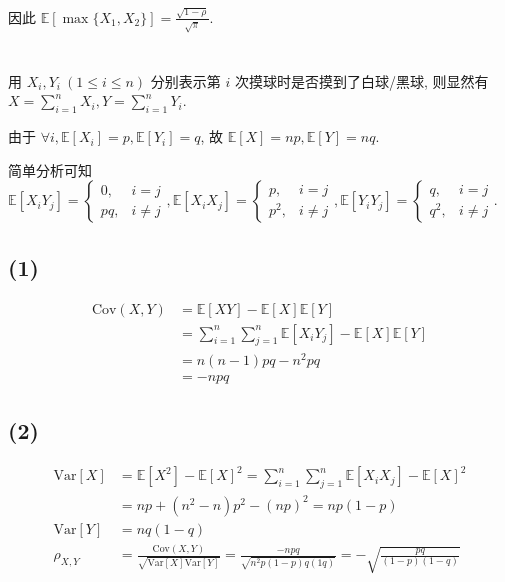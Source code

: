 \documentclass[8pt]{article}
\theoremstyle{compact}
\def\le{\leqslant}
\def\E#1{\mathbb{E}\left[{#1}\right]}
\def\Var#1{\text{Var}\left[{#1}\right]}
\def\Cov#1{\text{Cov}\left({#1}\right)}
\begin{document}
因此 $\E{\max\{X_1, X_2\}} = \frac{\sqrt{1 - \rho}}{\sqrt{\pi}}$.
\section{}
用 $X_i, Y_i \ (1 \le i \le n)$ 分别表示第 $i$ 次摸球时是否摸到了白球/黑球, 则显然有 $X = \sum_{i=1}^{n}X_i, Y = \sum_{i=1}^{n}Y_i$.

由于 $\forall i, \E{X_i} = p, \E{Y_i} = q$, 故 $\E{X} = np, \E{Y} = nq$.

简单分析可知 $\E{X_iY_j} = \begin{cases}0,&i=j\\pq,&i\neq j\end{cases}, \E{X_iX_j} = \begin{cases}p,&i=j\\p^2,&i\neq j\end{cases}, \E{Y_iY_j} = \begin{cases}q,&i=j\\q^2,&i\neq j\end{cases}$.
\subsection*{(1)}
\begin{equation*}
	\begin{split}
		\Cov{X, Y} &= \E{XY} - \E{X}\E{Y}\\
		&= \sum_{i=1}^{n}\sum_{j=1}^{n}\E{X_iY_j} - \E{X}\E{Y}\\
		&= n(n-1)pq - n^2pq\\
		&= -npq
	\end{split}
\end{equation*}
\subsection*{(2)}
\begin{equation*}
	\begin{split}
		\Var{X} &= \E{X^2} - \E{X}^2 = \sum_{i=1}^{n}\sum_{j=1}^n\E{X_iX_j} - \E{X}^2\\
		&= np + (n^2 - n)p^2 - (np)^2 = np(1-p)\\
		\Var{Y} &= nq(1-q)\\
		\rho_{X, Y} &= \frac{\Cov{X, Y}}{\sqrt{\Var{X}\Var{Y}}} = \frac{-npq}{\sqrt{n^2p(1-p)q(1q)}} = -\sqrt{\frac{pq}{(1-p)(1-q)}}
	\end{split}
\end{equation*}
\section{}
\end{document}
